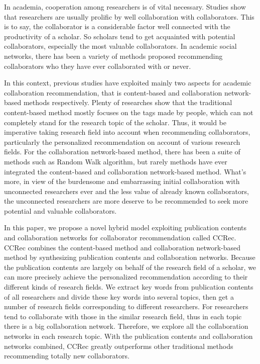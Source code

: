 \documentclass{acm_proc_article-sp}
\begin{document}
In academia, cooperation among researchers is of vital necessary. Studies show that researchers are usually prolific by well collaboration with collaborators. This is to say, the collaborator is a considerable factor well connected with the productivity of a scholar. So scholars tend to get acquainted with potential collaborators, especially the most valuable collaborators. In academic social networks, there has been a variety of methods proposed recommending collaborators who they have ever collaborated with or never.

In this context, previous studies have exploited mainly two aspects for academic collaboration recommendation, that is content-based and collaboration network-based methods respectively. Plenty of researches show that the traditional content-based method mostly focuses on the tags made by people, which can not completely stand for the research topic of the scholar. Thus, it would be imperative taking research field into account when recommending collaborators, particularly the personalized recommendation on account of various research fields. For the collaboration network-based method, there has been a suite of methods such as Random Walk algorithm, but rarely methods have ever integrated the content-based and collaboration network-based method. What's more, in view of the burdensome and embarrassing initial collaboration with unconnected researchers ever and the less value of already known collaborators, the unconnected researchers are more deserve to be recommended to seek more potential and valuable collaborators.

In this paper, we propose a novel hybrid model exploiting publication contents and collaboration networks for collaborator recommendation called CCRec. CCRec combines the content-based method and collaboration network-based method by synthesizing publication contents and collaboration networks. Because the publication contents are largely on behalf of the research field of a scholar, we can more precisely achieve the personalized recommendation according to their different kinds of research fields. We extract key words from publication contents of all researchers and divide these key words into several topics, then get a number of research fields corresponding to different researchers. For researchers tend to collaborate with those in the similar research field, thus in each topic there is a big collaboration network. Therefore, we explore all the collaboration networks in each research topic. With the publication contents and collaboration networks combined, CCRec greatly outperforms other traditional methods recommending totally new collaborators.
\end{document}
